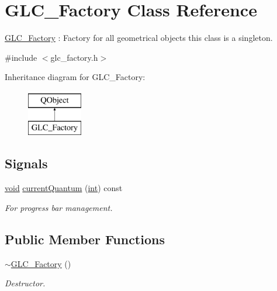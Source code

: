 \hypertarget{class_g_l_c___factory}{\section{G\-L\-C\-\_\-\-Factory Class Reference}
\label{class_g_l_c___factory}
}


\hyperlink{class_g_l_c___factory}{G\-L\-C\-\_\-\-Factory} \-: Factory for all geometrical objects this class is a singleton.  




{\ttfamily \#include $<$glc\-\_\-factory.\-h$>$}

Inheritance diagram for G\-L\-C\-\_\-\-Factory\-:\begin{figure}[H]
\begin{center}
\leavevmode
\includegraphics[height=2.000000cm]{class_g_l_c___factory}
\end{center}
\end{figure}
\subsection*{Signals}
\begin{DoxyCompactItemize}
\item 
\hyperlink{group___u_a_v_objects_plugin_ga444cf2ff3f0ecbe028adce838d373f5c}{void} \hyperlink{class_g_l_c___factory_a474e14112c1a55eebfa28dbc0cf75dab}{current\-Quantum} (\hyperlink{ioapi_8h_a787fa3cf048117ba7123753c1e74fcd6}{int}) const 
\begin{DoxyCompactList}\small\item\em For progress bar management. \end{DoxyCompactList}\end{DoxyCompactItemize}
\subsection*{Public Member Functions}
\begin{DoxyCompactItemize}
\item 
\hyperlink{class_g_l_c___factory_abc1f70f00c59a42963acc1089474f2ac}{$\sim$\-G\-L\-C\-\_\-\-Factory} ()
\begin{DoxyCompactList}\small\item\em Destructor. \end{DoxyCompactList}\end{DoxyCompactItemize}
